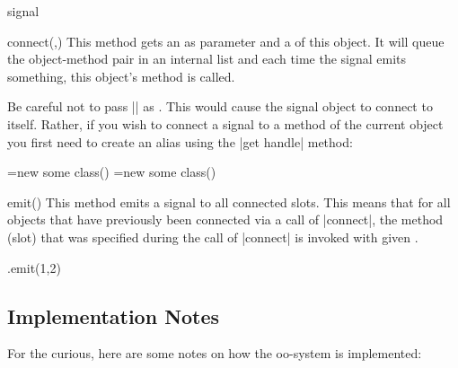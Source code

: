 \begin{ooclass}{signal}
  \begin{method}{connect(,)}
    This method gets an  as parameter and a
     of this object. It will queue the object-method
    pair in an internal list and each time the signal emits something,
    this object's method is called.

    Be careful not to pass |\pgfoothis| as . This
    would cause the signal object to connect to itself. Rather, if you
    wish to connect a signal to a method of the current object you
    first need to create an alias using the |get handle| method:
\begin{codeexample}
\pgfoonew \objA=new some class()
\pgfoonew \objB=new some class()
\end{codeexample}
  \end{method}

  \begin{method}{emit()}
    This method emits a signal to all connected slots. This means that
    for all objects that have previously been connected via a call of
    |connect|, the method (slot) that was specified during the call of
    |connect| is invoked with given .
\begin{codeexample}
\anothersignal.emit(1,2)
\end{codeexample}
  \end{method}
\end{ooclass}


\subsection{Implementation Notes}

For the curious, here are some notes on how the oo-system is
implemented:

